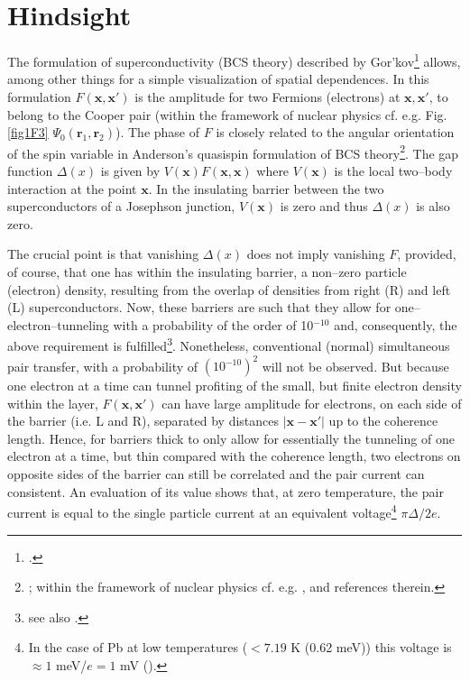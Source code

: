 \section{Hindsight}\label{C3AppE}
The formulation of superconductivity (BCS theory) described by Gor'kov\footnote{\cite{Gorkov:59}.} allows, among other things for a simple visualization of spatial dependences. In this formulation $F(\mathbf{x},\mathbf{x}')$ is the amplitude for two Fermions (electrons) at $\mathbf{x},\mathbf{x}'$, to belong to the Cooper pair (within the framework of nuclear physics cf. e.g. Fig. \ref{fig1F3} $\Psi_0(\mathbf{r}_1,\mathbf{r}_2)$). The phase of $F$ is closely  related to the angular orientation of the spin variable  in Anderson's quasispin formulation of BCS theory\footnote{\cite{Anderson:58b}; within the framework of nuclear physics cf. e.g. \cite{Bohr:88}, \cite{Potel:13b} and references therein.}. The gap function $\Delta(x)$ is given by $V(\mathbf{x})F(\mathbf{x},\mathbf{x})$ where $V(\mathbf{x})$ is the local two--body interaction at the point $\mathbf x$. In the insulating barrier between the two superconductors of a Josephson junction, $V(\mathbf{x})$ is zero and thus $\Delta(x)$ is also zero. 



The crucial point is that vanishing $\Delta(x)$ does not imply vanishing $F$, provided, of course, that one has within the insulating barrier, a non--zero particle (electron) density, resulting from the overlap of densities from right (R) and left (L) superconductors. Now, these barriers are such that they allow for one--electron--tunneling with a probability of the order of 10$^{-10}$ and, consequently, the above requirement is fulfilled\footnote{\cite{Pippard:12} see also \cite{McDonald:01}.}. Nonetheless, conventional (normal) simultaneous pair transfer, with a probability of $(10^{-10})^2$ will not be observed. But because one electron at a time can tunnel profiting of the small, but finite electron density within the layer,   $F(\mathbf{x},\mathbf{x}')$ can have large amplitude for electrons, on each side of the barrier (i.e. L and R), separated by distances $|\mathbf{x}-\mathbf{x}'|$ up to the coherence length. Hence, for barriers thick to only allow for essentially the tunneling of one electron at a time, but thin compared with the coherence length, two electrons on opposite sides of the barrier can still be correlated and the pair current can  consistent. An evaluation of its 
value shows that, at zero temperature, the pair current is equal to the single particle current at an equivalent voltage\footnote{In the case of Pb at low temperatures ($<7.19$ K (0.62 meV)) this voltage is $\approx 1$ meV/$e=1$ mV (\cite{Ambegaokar:63,McDonald:01,Tinkham:96}).} $\pi\Delta/2e$.


